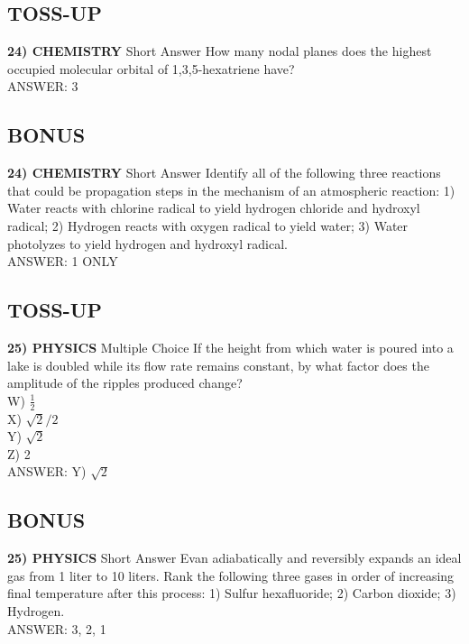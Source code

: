 \documentclass{article}
\begin{document}
\subsection*{TOSS-UP}
\textbf{24) CHEMISTRY} Short Answer How many nodal planes does the highest occupied molecular orbital of 1,3,5-hexatriene have?
\\ANSWER: 3

\subsection*{BONUS}
\textbf{24) CHEMISTRY} Short Answer Identify all of the following three reactions that could be propagation steps in the mechanism of an atmospheric reaction: 1) Water reacts with chlorine radical to yield hydrogen chloride and hydroxyl radical; 2) Hydrogen reacts with oxygen radical to yield water; 3) Water photolyzes to yield hydrogen and hydroxyl radical.
\\ANSWER: 1 ONLY

\subsection*{TOSS-UP}
\textbf{25) PHYSICS} Multiple Choice If the height from which water is poured into a lake is doubled while its flow rate remains constant, by what factor does the amplitude of the ripples produced change?
\\W) $\frac{1}{2}$
\\X) $\sqrt{2}/2$
\\Y) $\sqrt{2}$
\\Z) 2
\\ANSWER: Y) $\sqrt{2}$

\subsection*{BONUS}
\textbf{25) PHYSICS} Short Answer Evan adiabatically and reversibly expands an ideal gas from 1 liter to 10 liters. Rank the following three gases in order of increasing final temperature after this process: 1) Sulfur hexafluoride; 2) Carbon dioxide; 3) Hydrogen.
\\ANSWER: 3, 2, 1
\end{document}
